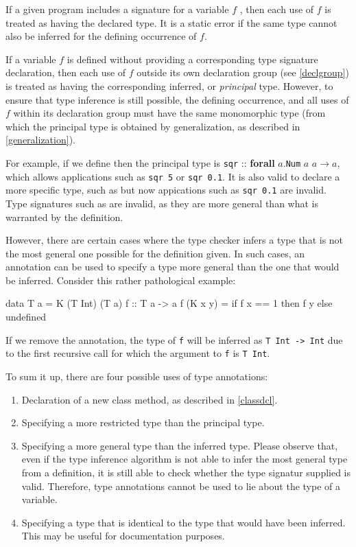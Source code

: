 If a given program includes a signature for a variable $f$ , then each use of $f$ is treated as having the declared type.
It is a static error if the same type cannot also be inferred for the defining occurrence of $f$.

If a variable $f$ is defined without providing a corresponding type signature declaration, then each use of $f$ outside its own declaration group (see \autoref{declgroup}) is treated as having the corresponding inferred, or \emph{principal} type.
However, to ensure that type inference is still possible, the defining occurrence, and all uses of $f$ within its declaration group must have the same monomorphic type (from which the principal type is obtained by generalization, as described in \autoref{generalization}).

For example, if we define 
then the principal type is \texttt{sqr} :: \textbf{forall} $a$.\texttt{Num} $a$ \sym{=>} $a \rightarrow{} a$, which allows applications such as \texttt{sqr 5} or \texttt{sqr 0.1}.
It is also valid to declare a more specific type, such as  but now appications such as \texttt{sqr 0.1} are invalid. Type signatures such as  are invalid, as they are more general than what is warranted by the definition.

However, there are certain cases where the type checker infers a type that is not the most general one possible for the definition given. In such cases, an annotation can be used to specify a type more general than the one that would be inferred. Consider this rather pathological example:
\begin{code}
data T a = K (T Int) (T a)
f :: T a -> a
f (K x y) = if f x == 1 then f y else undefined
\end{code}
If we remove the annotation, the type of \texttt{f} will be inferred as \texttt{T Int -> Int} due to the first recursive call for which the argument to \texttt{f} is \texttt{T Int}.

To sum it up, there are four possible uses of type annotations:
\begin{enumerate}
\item Declaration of a new class method, as described in \autoref{classdcl}.
\item Specifying a more restricted type than the principal type.
\item Specifying a more general type than the inferred type. Please observe that, even if the type inference algorithm is not able to infer the most general type from a definition, it is still able to check whether the type signatur supplied is valid. Therefore, type annotations cannot be used to lie about the type of a variable.
\item Specifying a type that is identical to the type that would have been inferred. This may be useful for documentation purposes.
\end{enumerate}


